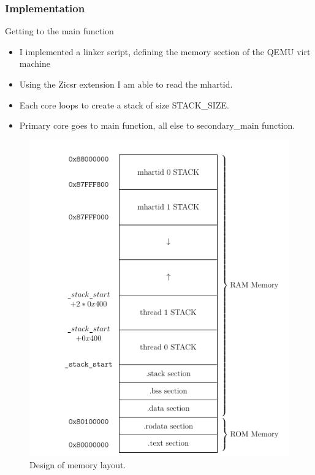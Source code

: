 \begin{frame}[hoved]
	\frametitle{Implementation}
	\begin{minipage}[t]{0.45\textwidth}
		{\large Getting to the main function}
		\begin{itemize}
			\item I implemented a linker script, defining the memory section of the
			      QEMU virt machine
			\item Using the Zicsr extension I am able to read the mhartid.
			\item Each core loops to create a stack of size STACK\_SIZE.
			\item Primary core goes to main function, all else to secondary\_main
			      function.
		\end{itemize}
	\end{minipage}
	\hfill
	\begin{minipage}[t]{0.45\textwidth}
		\begin{figure}
			\begin{center}
				\includegraphics[height=0.65\textheight]{figures/memory.png}
			\end{center}
			\caption{Design of memory layout.}\label{fig:mem_layout1}
		\end{figure}
	\end{minipage}
\end{frame}

